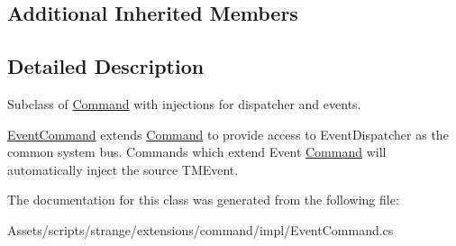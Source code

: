 \subsection*{Additional Inherited Members}


\subsection{Detailed Description}
Subclass of \hyperlink{classstrange_1_1extensions_1_1command_1_1impl_1_1_command}{Command} with injections for dispatcher and events. 

\hyperlink{classstrange_1_1extensions_1_1command_1_1impl_1_1_event_command}{Event\-Command} extends \hyperlink{classstrange_1_1extensions_1_1command_1_1impl_1_1_command}{Command} to provide access to Event\-Dispatcher as the common system bus. Commands which extend Event \hyperlink{classstrange_1_1extensions_1_1command_1_1impl_1_1_command}{Command} will automatically inject the source T\-M\-Event. 

The documentation for this class was generated from the following file\-:\begin{DoxyCompactItemize}
\item 
Assets/scripts/strange/extensions/command/impl/Event\-Command.\-cs\end{DoxyCompactItemize}
